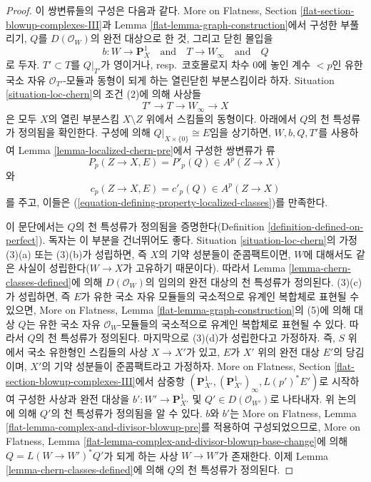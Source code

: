 \begin{proof}
이 쌍변류들의 구성은 다음과 같다. More on Flatness, Section
\ref{flat-section-blowup-complexes-III}과 Lemma
\ref{flat-lemma-graph-construction}에서 구성한 부풀리기, $Q$를
$D(\mathcal{O}_W)$의 완전 대상으로 한 것, 그리고 닫힌 몰입을
$$
b : W \longrightarrow \mathbf{P}^1_X
\quad\text{and}\quad
T \longrightarrow W_\infty
\quad\text{and}\quad
Q
$$
로 두자. $T' \subset T$를 $Q|_{T'}$가 영이거나, resp.\ 코호몰로지
차수 $0$에 놓인 계수 $< p$인 유한 국소 자유
$\mathcal{O}_{T'}$-모듈과 동형이 되게 하는 열린닫힌 부분스킴이라 하자.
Situation \ref{situation-loc-chern}의 조건 (2)에 의해 사상들
$$
T' \to T \to W_\infty \to X
$$
은 모두 $X$의 열린 부분스킴 $X \setminus Z$ 위에서 스킴들의
동형이다. 아래에서 $Q$의 천 특성류가 정의됨을 확인한다. 구성에 의해
$Q|_{X \times \{0\}} \cong E$임을 상기하면, $W, b, Q, T'$를 사용하여
Lemma \ref{lemma-localized-chern-pre}에서 구성한 쌍변류가 류
$$
P_p(Z \to X, E) = P'_p(Q) \in A^p(Z \to X)
$$
와
$$
c_p(Z \to X, E) = c'_p(Q) \in A^p(Z \to X)
$$
를 주고, 이들은 (\ref{equation-defining-property-localized-classes})를
만족한다.

\medskip\noindent
이 문단에서는 $Q$의 천 특성류가 정의됨을 증명한다(Definition
\ref{definition-defined-on-perfect}). 독자는 이 부분을 건너뛰어도 좋다.
Situation \ref{situation-loc-chern}의 가정 (3)(a) 또는 (3)(b)가
성립하면, 즉 $X$의 기약 성분들이 준콤팩트이면, $W$에 대해서도 같은
사실이 성립한다($W \to X$가 고유하기 때문이다). 따라서 Lemma
\ref{lemma-chern-classes-defined}에 의해 $D(\mathcal{O}_W)$의 임의의 완전
대상의 천 특성류가 정의된다. (3)(c)가 성립하면, 즉 $E$가 유한 국소
자유 모듈들의 국소적으로 유계인 복합체로 표현될 수 있으면, More on
Flatness, Lemma \ref{flat-lemma-graph-construction}의 (5)에 의해 대상
$Q$는 유한 국소 자유 $\mathcal{O}_W$-모듈들의 국소적으로 유계인
복합체로 표현될 수 있다. 따라서 $Q$의 천 특성류가 정의된다. 마지막으로
(3)(d)가 성립한다고 가정하자. 즉, $S$ 위에서 국소 유한형인 스킴들의
사상 $X \to X'$가 있고, $E$가 $X'$ 위의 완전 대상 $E'$의 당김이며,
$X'$의 기약 성분들이 준콤팩트라고 가정하자. More on Flatness, Section
\ref{flat-section-blowup-complexes-III}에서 삼중항
$(\mathbf{P}^1_{X'}, (\mathbf{P}^1_{X'})_\infty, L(p')^*E')$로 시작하여
구성한 사상과 완전 대상을
$b' : W' \to \mathbf{P}^1_{X'}$ 및 $Q' \in D(\mathcal{O}_{W'})$로
나타내자. 위 논의에 의해 $Q'$의 천 특성류가 정의됨을 알 수 있다.
$b$와 $b'$는 More on Flatness, Lemma
\ref{flat-lemma-complex-and-divisor-blowup-pre}를 적용하여 구성되었으므로,
More on Flatness, Lemma
\ref{flat-lemma-complex-and-divisor-blowup-base-change}에 의해
$Q = L(W \to W')^*Q'$가 되게 하는 사상 $W \to W'$가 존재한다. 이제
Lemma \ref{lemma-chern-classes-defined}에 의해 $Q$의 천 특성류가
정의된다.
\end{proof}

